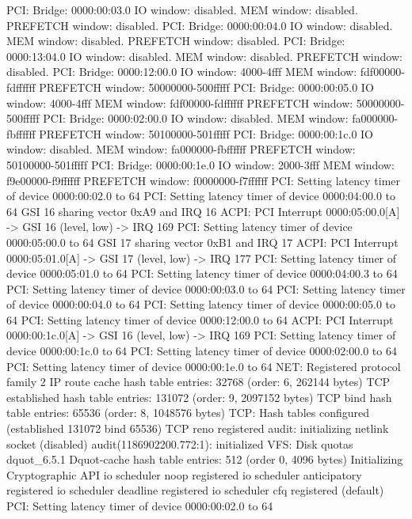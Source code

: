 \documentclass[mingoth,a4paper]{jsarticle}
\begin{document}
\begin{commandline}
PCI: Bridge: 0000:00:03.0
  IO window: disabled.
  MEM window: disabled.
  PREFETCH window: disabled.
PCI: Bridge: 0000:00:04.0
  IO window: disabled.
  MEM window: disabled.
  PREFETCH window: disabled.
PCI: Bridge: 0000:13:04.0
  IO window: disabled.
  MEM window: disabled.
  PREFETCH window: disabled.
PCI: Bridge: 0000:12:00.0
  IO window: 4000-4fff
  MEM window: fdf00000-fdffffff
  PREFETCH window: 50000000-500fffff
PCI: Bridge: 0000:00:05.0
  IO window: 4000-4fff
  MEM window: fdf00000-fdffffff
  PREFETCH window: 50000000-500fffff
PCI: Bridge: 0000:02:00.0
  IO window: disabled.
  MEM window: fa000000-fbffffff
  PREFETCH window: 50100000-501fffff
PCI: Bridge: 0000:00:1c.0
  IO window: disabled.
  MEM window: fa000000-fbffffff
  PREFETCH window: 50100000-501fffff
PCI: Bridge: 0000:00:1e.0
  IO window: 2000-3fff
  MEM window: f9e00000-f9ffffff
  PREFETCH window: f0000000-f7ffffff
PCI: Setting latency timer of device 0000:00:02.0 to 64
PCI: Setting latency timer of device 0000:04:00.0 to 64
GSI 16 sharing vector 0xA9 and IRQ 16
ACPI: PCI Interrupt 0000:05:00.0[A] -> GSI 16 (level, low) -> IRQ 169
PCI: Setting latency timer of device 0000:05:00.0 to 64
GSI 17 sharing vector 0xB1 and IRQ 17
ACPI: PCI Interrupt 0000:05:01.0[A] -> GSI 17 (level, low) -> IRQ 177
PCI: Setting latency timer of device 0000:05:01.0 to 64
PCI: Setting latency timer of device 0000:04:00.3 to 64
PCI: Setting latency timer of device 0000:00:03.0 to 64
PCI: Setting latency timer of device 0000:00:04.0 to 64
PCI: Setting latency timer of device 0000:00:05.0 to 64
PCI: Setting latency timer of device 0000:12:00.0 to 64
ACPI: PCI Interrupt 0000:00:1c.0[A] -> GSI 16 (level, low) -> IRQ 169
PCI: Setting latency timer of device 0000:00:1c.0 to 64
PCI: Setting latency timer of device 0000:02:00.0 to 64
PCI: Setting latency timer of device 0000:00:1e.0 to 64
NET: Registered protocol family 2
IP route cache hash table entries: 32768 (order: 6, 262144 bytes)
TCP established hash table entries: 131072 (order: 9, 2097152 bytes)
TCP bind hash table entries: 65536 (order: 8, 1048576 bytes)
TCP: Hash tables configured (established 131072 bind 65536)
TCP reno registered
audit: initializing netlink socket (disabled)
audit(1186902200.772:1): initialized
VFS: Disk quotas dquot_6.5.1
Dquot-cache hash table entries: 512 (order 0, 4096 bytes)
Initializing Cryptographic API
io scheduler noop registered
io scheduler anticipatory registered
io scheduler deadline registered
io scheduler cfq registered (default)
PCI: Setting latency timer of device 0000:00:02.0 to 64

\end{commandline}
\end{document}
